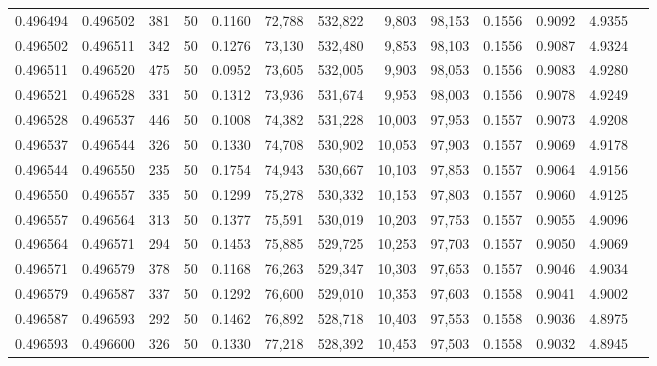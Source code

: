 \begin{tabular}{rrrrrrrrrrrrr}
0.496494 & 0.496502 & 381 &  50 &                                     0.1160 &  72,788 & 532,822 &   9,803 &  98,153 & 0.1556 & 0.9092 & 4.9355 \\
0.496502 & 0.496511 & 342 &  50 &                                     0.1276 &  73,130 & 532,480 &   9,853 &  98,103 & 0.1556 & 0.9087 & 4.9324 \\
0.496511 & 0.496520 & 475 &  50 &                                     0.0952 &  73,605 & 532,005 &   9,903 &  98,053 & 0.1556 & 0.9083 & 4.9280 \\
0.496521 & 0.496528 & 331 &  50 &                                     0.1312 &  73,936 & 531,674 &   9,953 &  98,003 & 0.1556 & 0.9078 & 4.9249 \\
0.496528 & 0.496537 & 446 &  50 &                                     0.1008 &  74,382 & 531,228 &  10,003 &  97,953 & 0.1557 & 0.9073 & 4.9208 \\
0.496537 & 0.496544 & 326 &  50 &                                     0.1330 &  74,708 & 530,902 &  10,053 &  97,903 & 0.1557 & 0.9069 & 4.9178 \\
0.496544 & 0.496550 & 235 &  50 &                                     0.1754 &  74,943 & 530,667 &  10,103 &  97,853 & 0.1557 & 0.9064 & 4.9156 \\
0.496550 & 0.496557 & 335 &  50 &                                     0.1299 &  75,278 & 530,332 &  10,153 &  97,803 & 0.1557 & 0.9060 & 4.9125 \\
0.496557 & 0.496564 & 313 &  50 &                                     0.1377 &  75,591 & 530,019 &  10,203 &  97,753 & 0.1557 & 0.9055 & 4.9096 \\
0.496564 & 0.496571 & 294 &  50 &                                     0.1453 &  75,885 & 529,725 &  10,253 &  97,703 & 0.1557 & 0.9050 & 4.9069 \\
0.496571 & 0.496579 & 378 &  50 &                                     0.1168 &  76,263 & 529,347 &  10,303 &  97,653 & 0.1557 & 0.9046 & 4.9034 \\
0.496579 & 0.496587 & 337 &  50 &                                     0.1292 &  76,600 & 529,010 &  10,353 &  97,603 & 0.1558 & 0.9041 & 4.9002 \\
0.496587 & 0.496593 & 292 &  50 &                                     0.1462 &  76,892 & 528,718 &  10,403 &  97,553 & 0.1558 & 0.9036 & 4.8975 \\
0.496593 & 0.496600 & 326 &  50 &                                     0.1330 &  77,218 & 528,392 &  10,453 &  97,503 & 0.1558 & 0.9032 & 4.8945 \\

\end{tabular}

